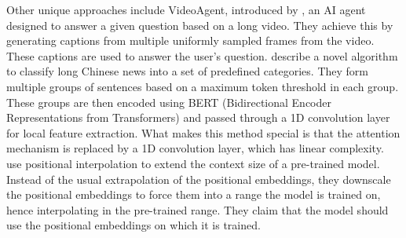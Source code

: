 	Other unique approaches include VideoAgent, introduced by \citet{wang2024videoagent}, an AI agent
	designed to answer a given question based on a long video.
	They achieve this by generating captions from multiple uniformly sampled frames from the video.
	These captions are used to answer the user's question.
	\citet{chen2022long} describe a novel algorithm to classify long Chinese news into a set of
	predefined categories.
	They form multiple groups of sentences based on a maximum token threshold in each group.
	These groups are then encoded using BERT (Bidirectional Encoder Representations from Transformers)
	\cite{devlin2018bert} and passed through a 1D convolution layer for local feature extraction.
	What makes this method special is that the attention mechanism is replaced by a 1D convolution
	layer, which has linear complexity.
	\citet{chen2023extending} use positional interpolation to extend the context size of a
	pre-trained model.
	Instead of the usual extrapolation of the positional embeddings, they downscale the positional
	embeddings to force them into a range the model is trained on, hence interpolating in the
	pre-trained range.
	They claim that the model should use the positional embeddings on which it is trained.
